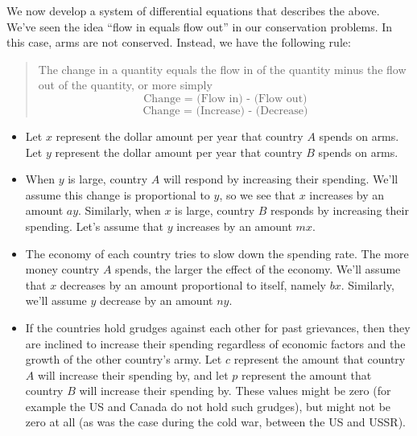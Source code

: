 { We now develop a system of differential equations that describes the above. We've seen the idea ``flow in equals flow out'' in our conservation problems.  In this case, arms are not conserved.  Instead, we have the following rule:
\begin{quote}
 The change in a quantity equals the flow in of the quantity minus the flow out of the quantity, or more simply 
$$\text{Change = (Flow in) - (Flow out)}$$
$$\text{Change = (Increase) - (Decrease)}$$
\end{quote}
\begin{itemize}
\item Let $x$ represent the dollar amount per year that country $A$ spends on arms. Let $y$ represent the dollar amount per year that country $B$ spends on arms.  
\item When $y$ is large, country $A$ will respond by increasing their spending.  
We'll assume this change is proportional to $y$, so we see that $x$ increases by an amount $ay$. 
 Similarly, when $x$ is large, country $B$ responds by increasing their spending. Let's assume that $y$ increases by an amount $mx$.
\item The economy of each country tries to slow down the spending rate.  The more money country $A$ spends, the larger the effect of the economy.  We'll assume that $x$ decreases by an amount proportional to itself, namely $bx$.  Similarly, we'll assume $y$ decrease by an amount $ny$.
\item If the countries hold grudges against each other for past grievances, then they are inclined to increase their spending regardless of economic factors and the growth of the other country's army.  Let $c$ represent the amount that country $A$ will increase their spending by, and let $p$ represent the amount that country $B$ will increase their spending by. These values might be zero (for example the US and Canada do not hold such grudges), but might not be zero at all (as was the case during the cold war, between the US and USSR).
\end{itemize}

}
